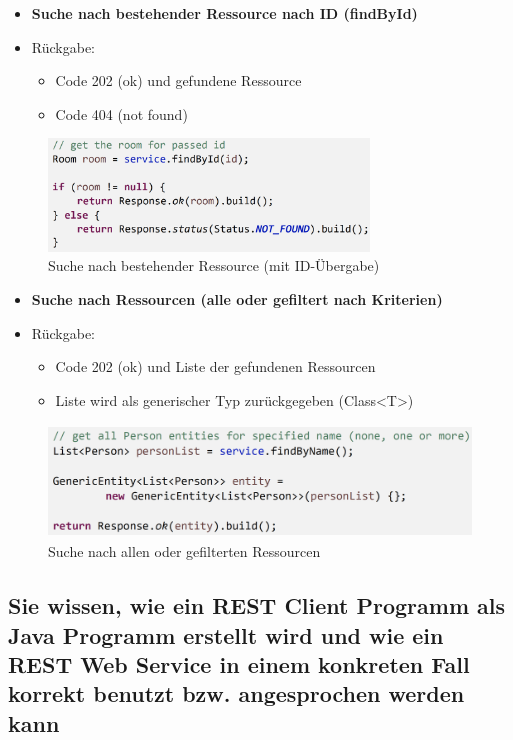 \documentclass[a4paper]{article}
\begin{document}
		
			\begin{itemize}
				\item \textbf{Suche nach bestehender Ressource nach ID (findById)}
				\item Rückgabe:
				\begin{itemize}
					\item Code 202 (ok) und gefundene Ressource
					\item Code 404 (not found)
				\end{itemize}
			\end{itemize}
			\begin{figure}[!htb]
				\centering
				\includegraphics[keepaspectratio, height=3cm]{img/ws/resp_04.png}
				\caption{Suche nach bestehender Ressource (mit ID-Übergabe)}
				\label{fig:resp_04}
			\end{figure}
		
		
			\begin{itemize}
				\item \textbf{Suche nach Ressourcen (alle oder gefiltert nach Kriterien)}
				\item Rückgabe:
				\begin{itemize}
					\item Code 202 (ok) und Liste der gefundenen Ressourcen
					\item Liste wird als generischer Typ zurückgegeben (Class<T>)
				\end{itemize}
			\end{itemize}
			\begin{figure}[!htb]
				\centering
				\includegraphics[keepaspectratio, height=3cm]{img/ws/resp_05.png}
				\caption{Suche nach allen oder gefilterten Ressourcen}
				\label{fig:resp_05}
			\end{figure}
		
		\newpage	
		
		\subsection{Sie wissen, wie ein REST Client Programm als Java Programm erstellt wird und wie ein REST Web Service in einem konkreten Fall korrekt benutzt bzw. angesprochen werden kann}
		
\end{document}
